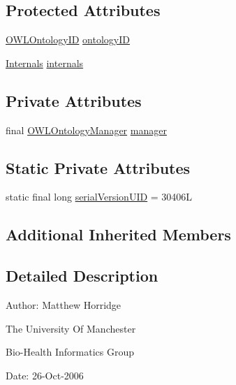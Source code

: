 \subsection*{Protected Attributes}
\begin{DoxyCompactItemize}
\item 
\hyperlink{classorg_1_1semanticweb_1_1owlapi_1_1model_1_1_o_w_l_ontology_i_d}{O\-W\-L\-Ontology\-I\-D} \hyperlink{classuk_1_1ac_1_1manchester_1_1cs_1_1owl_1_1owlapi_1_1_o_w_l_ontology_impl_aace8dbfe714fb87d1816cb792cbd1695}{ontology\-I\-D}
\item 
\hyperlink{interfaceuk_1_1ac_1_1manchester_1_1cs_1_1owl_1_1owlapi_1_1_internals}{Internals} \hyperlink{classuk_1_1ac_1_1manchester_1_1cs_1_1owl_1_1owlapi_1_1_o_w_l_ontology_impl_adf0cde908362d9fa72bf9d86a932bf72}{internals}
\end{DoxyCompactItemize}
\subsection*{Private Attributes}
\begin{DoxyCompactItemize}
\item 
final \hyperlink{interfaceorg_1_1semanticweb_1_1owlapi_1_1model_1_1_o_w_l_ontology_manager}{O\-W\-L\-Ontology\-Manager} \hyperlink{classuk_1_1ac_1_1manchester_1_1cs_1_1owl_1_1owlapi_1_1_o_w_l_ontology_impl_a5d4d9b357f427678556b0364c20fbe12}{manager}
\end{DoxyCompactItemize}
\subsection*{Static Private Attributes}
\begin{DoxyCompactItemize}
\item 
static final long \hyperlink{classuk_1_1ac_1_1manchester_1_1cs_1_1owl_1_1owlapi_1_1_o_w_l_ontology_impl_aa0524f237baa931122fe5d49ec04935d}{serial\-Version\-U\-I\-D} = 30406\-L
\end{DoxyCompactItemize}
\subsection*{Additional Inherited Members}


\subsection{Detailed Description}
Author\-: Matthew Horridge\par
 The University Of Manchester\par
 Bio-\/\-Health Informatics Group\par
 Date\-: 26-\/\-Oct-\/2006\par
 \par
 

